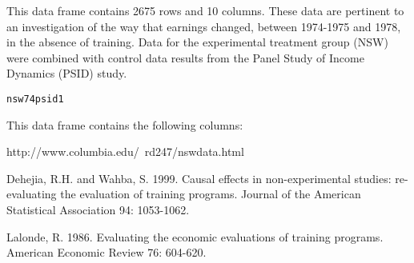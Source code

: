 \begin{Description}\relax
This data frame contains 2675 rows and 10 columns.
These data are pertinent to an investigation of the way that   
earnings changed, between 1974-1975 and 1978, in the absence
of training.  Data for the experimental treatment 
group (NSW) were combined with control data results from the 
Panel Study of Income Dynamics (PSID) study.
\end{Description}
\begin{Usage}
\begin{verbatim}nsw74psid1\end{verbatim}
\end{Usage}
\begin{Format}\relax
This data frame contains the following columns:
\end{Format}
\begin{Source}\relax
http://www.columbia.edu/~rd247/nswdata.html
\end{Source}
\begin{References}\relax
Dehejia, R.H. and Wahba, S. 1999. Causal effects in
non-experimental studies: re-evaluating the evaluation of training
programs. Journal of the American Statistical Association 94:
1053-1062.

Lalonde, R. 1986. Evaluating the economic evaluations of
training programs. American Economic Review 76: 604-620.
\end{References}
